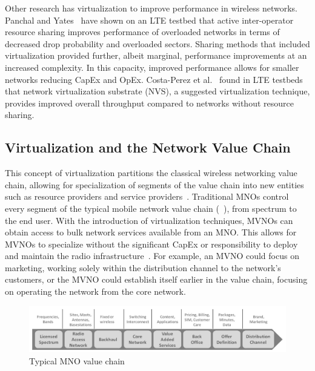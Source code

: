 \documentclass[12pt,dvipsnames]{report}
\begin{document}
Other research has virtualization to improve performance in wireless networks.  Panchal and Yates~\cite{6571315} have shown on an LTE testbed that active inter-operator resource sharing improves performance of overloaded networks in terms of decreased drop probability and overloaded sectors.  Sharing methods that included virtualization provided further, albeit marginal, performance improvements at an increased complexity.  In this capacity, improved performance allows for smaller networks reducing CapEx and OpEx.  Costa-Perez et al.~\cite{6553675} found in LTE testbeds that network virtualization substrate (NVS), a suggested virtualization technique, provides improved overall throughput compared to networks without resource sharing.

\subsection{Virtualization and the Network Value Chain} \label{subsec:virtualization_valuechain}

This concept of virtualization partitions the classical wireless networking value chain, allowing for specialization of segments of the value chain into new entities such as resource providers and service providers~\cite{1421931}.  Traditional MNOs control every segment of the typical mobile network value chain (~\cite{6737248}), from spectrum to the end user.  With the introduction of virtualization techniques, MVNOs can obtain access to bulk network services available from an MNO.  This allows for MVNOs to specialize without the significant CapEx or responsibility to deploy and maintain the radio infrastructure~\cite{6737248}.  For example, an MVNO could focus on marketing, working solely within the distribution channel to the network's customers, or the MVNO could establish itself earlier in the value chain, focusing on operating the network from the core network.

\begin{figure}[ht]
	\centering
	\includegraphics[width=1\linewidth]{ClassicNetworkValueChain}
	\caption[Typical MNO value chain]{Typical MNO value chain~\cite{6737248}}
	\label{fig:ClassicNetworkValueChain}
\end{figure}
\end{document}
